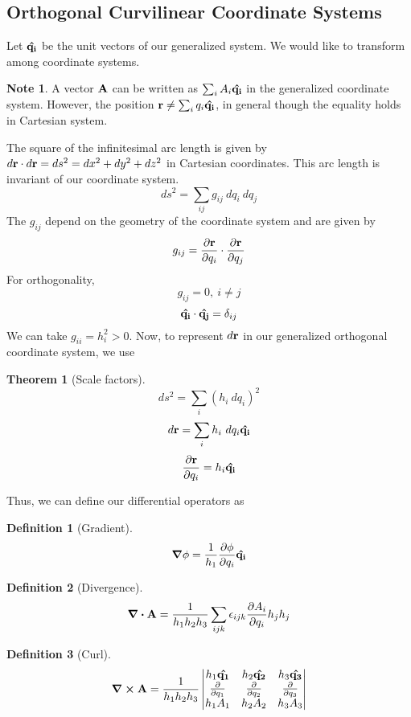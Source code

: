 \documentclass[10pt, a4paper]{extarticle}
\theoremstyle{definition}
\newtheorem{thm}{Theorem}
\newtheorem{defn}{Definition}
\newtheorem*{note*}{Note}
\begin{document}
\subsection{Orthogonal Curvilinear Coordinate Systems}
Let $\vu{q_i}$ be the unit vectors of our generalized system. We would like to transform among coordinate systems.
\begin{note*}
	A vector $\vb{A}$ can be written as $\sum_i A_i\vu{q_i}$ in the generalized coordinate system. However, the position $\vb{r}\neq \sum_i q_i\vu{q_i}$, in general though the equality holds in Cartesian system.
\end{note*}
The square of the infinitesimal arc length is given by $d\vb{r}\cdot d\vb{r}=ds^2=dx^2+dy^2+dz^2$ in Cartesian coordinates. This arc length is invariant of our coordinate system.
\[ds^2=\sum_{ij}g_{ij}\ dq_i\ dq_j\]
		The $g_{ij}$ depend on the geometry of the coordinate system and are given by
		\[g_{ij}=\pdv{\vb{r}}{q_i}\cdot\pdv{\vb{r}}{q_j}\]
		For orthogonality,
		\[g_{ij}=0,\ i\neq j\]\[\vu{q_i}\cdot\vu{q_j}=\delta_{ij}\]
		We can take $g_{ii}=h_i^2>0$. Now, to represent $d\vb{r}$ in our generalized orthogonal coordinate system, we use
\begin{framed}
	\begin{thm}[Scale factors]
		\[ds^2=\sum_i(h_i\ dq_i)^2\]
		\[d\vb{r}=\sum_i h_i\ dq_i\vu{q_i}\]
		\[\pdv{\vb{r}}{q_i}=h_i\vu{q_i}\]
	\end{thm}
\end{framed}
Thus, we can define our differential operators as
\begin{framed}
	\begin{defn}[Gradient]
		\[\grad{\phi}=\frac{1}{h_1}\pdv{\phi}{q_i}\vu{q_i}\]
	\end{defn}
	\begin{defn}[Divergence]
		\[\div{\vb{A}}=\frac{1}{h_1h_2h_3}\sum_{ijk}\epsilon_{ijk}\pdv{A_i}{q_i}h_jh_j\]
	\end{defn}
	\begin{defn}[Curl]
		\[\curl{\vb{A}}=\frac{1}{h_1h_2h_3}\left|
			\begin{matrix}
				h_1\vu{q_1}&h_2\vu{q_2}&h_3\vu{q_3}\\
				\pdv{}{q_1}&\pdv{}{q_2}&\pdv{}{q_3}\\
				h_1A_1&h_2A_2&h_3A_3
			\end{matrix}
		\right|\]
	\end{defn}
\end{framed}
\end{document}
